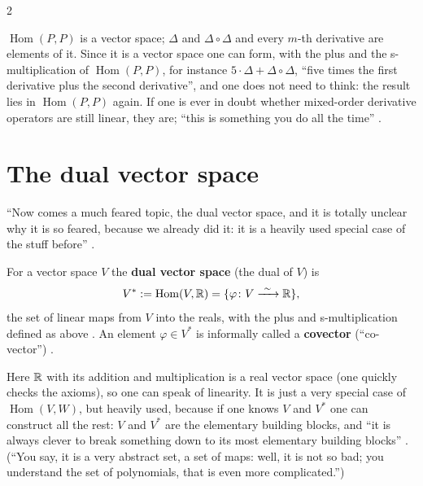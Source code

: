 \begin{paracol}{2}
\begin{example}\label{ex:c03-homPP}
$\operatorname{Hom}(P,P)$ is a vector space; $\Delta$ and $\Delta\circ\Delta$ and every $m$-th derivative are elements of it. Since it is a vector space one can form, with the plus and the s-multiplication of $\operatorname{Hom}(P,P)$,
for instance $5\cdot\Delta+\Delta\circ\Delta$, ``five times the first derivative plus the second derivative'', and one does not need to think: the result lies in $\operatorname{Hom}(P,P)$ again. If one is ever in doubt whether mixed-order derivative operators are still
linear, they are; ``this is something you do all the time'' .
\end{example}

\section{The dual vector space}\label{sec:c03-dual}

``Now comes a much feared topic, the dual vector space, and it is totally unclear why it is so feared, because we already did it: it is a heavily used special case of the stuff before'' .

\begin{definition}\label{def:c03-dual}
For a vector space $V$ the \textbf{dual vector space} (the dual of $V$) is
\[
  V^*:=\operatorname{Hom}(V,\mathbb{R})=\{\varphi\colon V\xrightarrow{\ \sim\ }\mathbb{R}\},
\]
the set of linear maps from $V$ into the reals, with the plus and s-multiplication defined as above .
An element $\varphi\in V^*$ is informally called a \textbf{covector} (``co-vector'') .
\end{definition}
Here $\mathbb{R}$ with its addition and multiplication is a real vector space (one quickly checks the axioms), so one can speak of linearity. It is just a very special case of $\operatorname{Hom}(V,W)$, but heavily used, because if one knows $V$ and $V^*$ one can construct all the rest:
$V$ and $V^*$ are the elementary building blocks, and ``it is always clever to break something down to its most elementary building blocks'' .
(``You say, it is a very abstract set, a set of maps: well, it is not so bad; you understand the set of polynomials, that is even more complicated.'')


\end{paracol}
